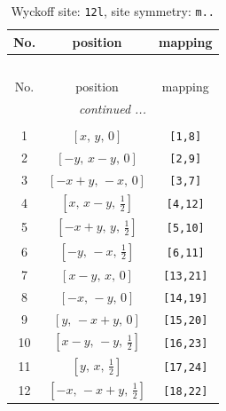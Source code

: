 \documentclass[fleqn,8pt]{jsarticle}
\begin{document}
\begin{longtable}{ccc}
\caption{Wyckoff site: {\tt 12l}, site symmetry: {\tt m..}}
 \\
 \hline \hline
No. & position & mapping \\ \hline \endfirsthead

\multicolumn{2}{l}{\tablename\ \thetable{}} \\
 \hline \hline
No. & position & mapping \\ \hline \endhead

 \hline \hline
\multicolumn{2}{r}{\footnotesize\it continued ...} \\ \endfoot

 \hline \hline
\multicolumn{2}{r}{} \\ \endlastfoot

1 & $\left[ x,\, y,\, 0 \right]$ & {\tt [1,8]} \\ \hline
2 & $\left[ - y,\, x - y,\, 0 \right]$ & {\tt [2,9]} \\ \hline
3 & $\left[ - x + y,\, - x,\, 0 \right]$ & {\tt [3,7]} \\ \hline
4 & $\left[ x,\, x - y,\, \frac{1}{2} \right]$ & {\tt [4,12]} \\ \hline
5 & $\left[ - x + y,\, y,\, \frac{1}{2} \right]$ & {\tt [5,10]} \\ \hline
6 & $\left[ - y,\, - x,\, \frac{1}{2} \right]$ & {\tt [6,11]} \\ \hline
7 & $\left[ x - y,\, x,\, 0 \right]$ & {\tt [13,21]} \\ \hline
8 & $\left[ - x,\, - y,\, 0 \right]$ & {\tt [14,19]} \\ \hline
9 & $\left[ y,\, - x + y,\, 0 \right]$ & {\tt [15,20]} \\ \hline
10 & $\left[ x - y,\, - y,\, \frac{1}{2} \right]$ & {\tt [16,23]} \\ \hline
11 & $\left[ y,\, x,\, \frac{1}{2} \right]$ & {\tt [17,24]} \\ \hline
12 & $\left[ - x,\, - x + y,\, \frac{1}{2} \right]$ & {\tt [18,22]} \\
\end{longtable}
\renewcommand{\arraystretch}{1.2}
\end{document}
